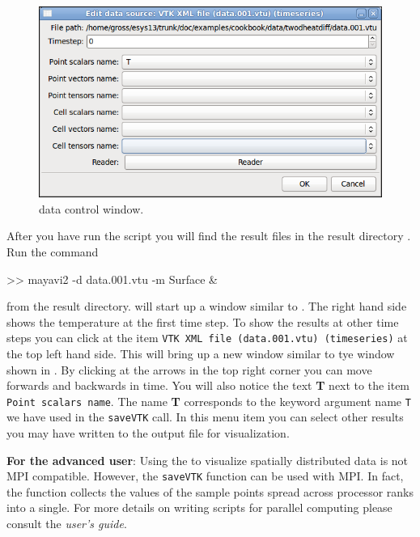 \begin{figure}[ht]
\centerline{\includegraphics[width=4.in]{figures/ScreeshotMayavi2n2}}
\caption{\mayavi data control window.}
\label{fig:mayavi window2}
\end{figure}
After you have run the script you will find the 
result files  in the result directory . Run the 
command
\begin{python}
>> mayavi2 -d data.001.vtu -m Surface &
\end{python}
from the result directory. \mayavi will start up a window similar to .
The right hand side shows the temperature at the first time step. To show
the results at other time steps you can click at the item \texttt{VTK XML file (data.001.vtu) (timeseries)}
at the top left hand side. This will bring up a new window similar to tye window shown in  . By clicking at the arrows in the top right corner you can move forwards and backwards in time. 
You will also notice the text \textbf{T} next to the item \texttt{Point scalars name}. The
name \textbf{T} corresponds to the keyword argument name \texttt{T} we have used 
in the \verb|saveVTK| call. In this menu item you can select other results 
you may have written to the output file for visualization.

\textbf{For the advanced user}: Using the \modmpl to visualize spatially distributed data 
is not MPI compatible. However, the \verb|saveVTK| function can be used with MPI. In fact,
the function collects the values of the sample points spread across processor ranks into a single.
For more details on writing scripts for parallel computing please consult the \emph{user's guide}.